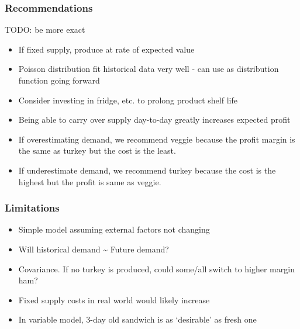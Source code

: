 \documentclass[]{article}
\begin{document}
\subsubsection{Recommendations}\label{recommendations}

TODO: be more exact

\begin{itemize}
\itemsep1pt\parskip0pt
\item
  If fixed supply, produce at rate of expected value
\item
  Poisson distribution fit historical data very well - can use as
  distribution function going forward
\item
  Consider investing in fridge, etc. to prolong product shelf life
\item
  Being able to carry over supply day-to-day greatly increases expected
  profit
\item
  If overestimating demand, we recommend veggie because the profit
  margin is the same as turkey but the cost is the least.
\item
  If underestimate demand, we recommend turkey because the cost is the
  highest but the profit is same as veggie.
\end{itemize}

\subsubsection{Limitations}\label{limitations}

\begin{itemize}
\itemsep1pt\parskip0pt
\item
  Simple model assuming external factors not changing
\item
  Will historical demand \textasciitilde{} Future demand?
\item
  Covariance. If no turkey is produced, could some/all switch to higher
  margin ham?
\item
  Fixed supply costs in real world would likely increase
\item
  In variable model, 3-day old sandwich is as `desirable' as fresh one
\end{itemize}
\end{document}
